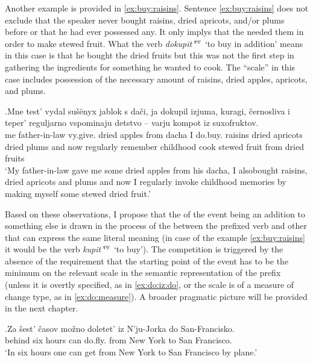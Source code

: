 Another example is provided in \ref{ex:buy:raisins}. Sentence \ref{ex:buy:raisins} does not exclude that the speaker never bought raisins, dried apricots, and/or plums before or that he had ever possessed any. It only implys that the needed them in order to make stewed fruit. What the verb \textit{dokupit'}$^{\textsc{pf}}$ `to buy in addition' means in this case is that he bought the dried fruits but this was not the first step in gathering the ingredients for something he wanted to cook. The ``scale'' in this case includes possession of the necessary amount of raisins, dried apples, apricots, and plums. 

\exg.\label{ex:buy:raisins}Mne test' vydal su\v{s}\"{e}nyx jablok s da\v{c}i, ja dokupil izjuma, kuragi, \v{c}ernosliva i teper' reguljarno vspominaju detstvo -- varju kompot iz suxofruktov.\\
me father-in-law vy.give. dried apples from dacha I do.buy. raisins {dried apricots} {dried plums} and now regularly remember childhood {} cook {stewed fruit} from {dried fruits}\\
\trans `My father-in-law gave me some dried apples from his dacha, I also\linebreak bought raisins, dried apricots and plums and now I regularly invoke childhood memories by making myself some stewed dried fruit.'\\

Based on these observations, I propose that the  of the event being an addition to something else is drawn in the process of the  between the prefixed verb and other  that can express the same literal meaning (in case of the example \ref{ex:buy:raisins} it would be the verb \textit{kupit'$^{\textsc{pf}}$} `to buy'). The competition is triggered by the absence of the requirement that the starting point of the event has to be the minimum on the relevant scale in the semantic representation of the prefix  (unless it is overtly specified, as in \ref{ex:do:iz:do}, or the scale is of a measure of change type, as in \ref{ex:do:measure}). A broader pragmatic picture will be provided in the next chapter.

\exg.\label{ex:do:iz:do}Za \v{s}est' \v{c}asov mo\v{z}no doletet' iz N'ju-Jorka do San-Francisko.\\
behind six hours can do.fly. from {New York} to {San Francisco}.\\
\trans `In six hours one can get from New York to San Francisco by plane.'\\

